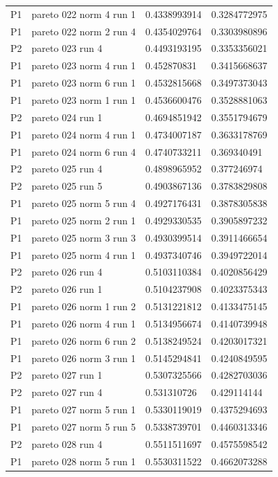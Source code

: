 \begin{tabular}{@{}llll@{}}
P1 & pareto 022 norm 4 run 1 & 0.4338993914 & 0.3284772975 \\
P1 & pareto 022 norm 2 run 4 & 0.4354029764 & 0.3303980896 \\
P2 & pareto 023 run 4 & 0.4493193195 & 0.3353356021 \\
P1 & pareto 023 norm 4 run 1 & 0.452870831 & 0.3415668637 \\
P1 & pareto 023 norm 6 run 1 & 0.4532815668 & 0.3497373043 \\
P1 & pareto 023 norm 1 run 1 & 0.4536600476 & 0.3528881063 \\
P2 & pareto 024 run 1 & 0.4694851942 & 0.3551794679 \\
P1 & pareto 024 norm 4 run 1 & 0.4734007187 & 0.3633178769 \\
P1 & pareto 024 norm 6 run 4 & 0.4740733211 & 0.369340491 \\
P2 & pareto 025 run 4 & 0.4898965952 & 0.377246974 \\
P2 & pareto 025 run 5 & 0.4903867136 & 0.3783829808 \\
P1 & pareto 025 norm 5 run 4 & 0.4927176431 & 0.3878305838 \\
P1 & pareto 025 norm 2 run 1 & 0.4929330535 & 0.3905897232 \\
P1 & pareto 025 norm 3 run 3 & 0.4930399514 & 0.3911466654 \\
P1 & pareto 025 norm 4 run 1 & 0.4937340746 & 0.3949722014 \\
P2 & pareto 026 run 4 & 0.5103110384 & 0.4020856429 \\
P2 & pareto 026 run 1 & 0.5104237908 & 0.4023375343 \\
P1 & pareto 026 norm 1 run 2 & 0.5131221812 & 0.4133475145 \\
P1 & pareto 026 norm 4 run 1 & 0.5134956674 & 0.4140739948 \\
P1 & pareto 026 norm 6 run 2 & 0.5138249524 & 0.4203017321 \\
P1 & pareto 026 norm 3 run 1 & 0.5145294841 & 0.4240849595 \\
P2 & pareto 027 run 1 & 0.5307325566 & 0.4282703036 \\
P2 & pareto 027 run 4 & 0.531310726 & 0.429114144 \\
P1 & pareto 027 norm 5 run 1 & 0.5330119019 & 0.4375294693 \\
P1 & pareto 027 norm 5 run 5 & 0.5338739701 & 0.4460313346 \\
P2 & pareto 028 run 4 & 0.5511511697 & 0.4575598542 \\
P1 & pareto 028 norm 5 run 1 & 0.5530311522 & 0.4662073288 \\

\end{tabular}
